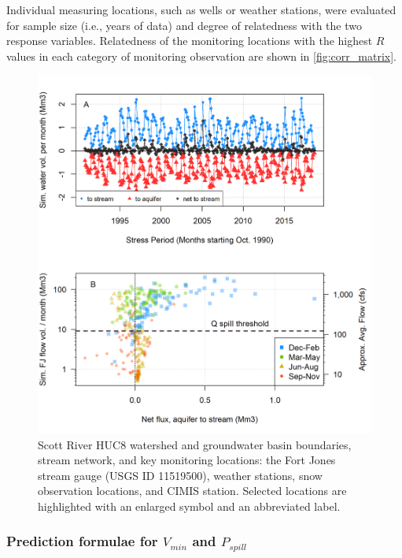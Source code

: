 \documentclass[
]{article}
\begin{document}
Individual measuring locations, such as wells or weather stations, were
evaluated for sample size (i.e., years of data) and degree of
relatedness with the two response variables. Relatedness of the
monitoring locations with the highest \(R\) values in each category of
monitoring observation are shown in \autoref{fig:corr_matrix}.

\begin{figure}
\includegraphics[width=1\linewidth]{f03} \caption{\label{fig:watershed_fig_ch3} Scott River HUC8 watershed and groundwater basin boundaries, stream network, and key monitoring locations: the Fort Jones stream gauge (USGS ID 11519500), weather stations, snow observation locations, and CIMIS station. Selected locations are highlighted with an enlarged symbol and an abbreviated label.}\label{fig:watershed_fig_ch3}
\end{figure}

\hypertarget{prediction-formulae-for-v_min-and-p_spill}{%
\subsubsection{\texorpdfstring{Prediction formulae for \(V_{min}\) and
\(P_{spill}\)}{Prediction formulae for V\_\{min\} and P\_\{spill\}}}\label{prediction-formulae-for-v_min-and-p_spill}}
\end{document}
